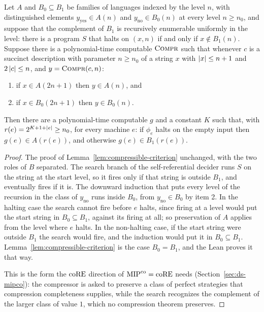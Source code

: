\begin{lemma}
\label{lem:compressible-criterion-nested}
\leanok
Let $A$ and $B_0 \subseteq B_1$ be families of languages indexed by the level $n$, with
distinguished elements $y_{\mathrm{yes}} \in A(n)$ and $y_{\mathrm{no}} \in B_0(n)$ at every
level $n \geq n_0$, and suppose that the complement of $B_1$ is recursively enumerable
uniformly in the level: there is a program $S$ that halts on $(x, n)$ if and only if
$x \notin B_1(n)$. Suppose there is a polynomial-time computable $\textsc{Compr}$ such that whenever
$c$ is a succinct description with parameter $n \geq n_0$ of a string $x$ with
$\left\vert {x} \right\vert \leq n + 1$ and $2\left\vert {c} \right\vert \leq n$, and $y = \textsc{Compr}(c, n)$:
\begin{enumerate}
\item if $x \in A(2n+1)$ then $y \in A(n)$, and
\item if $x \in B_0(2n+1)$ then $y \in B_0(n)$.
\end{enumerate}
Then there are a polynomial-time computable $g$ and a constant $K$ such that, with
$r(e) = 2^{K + 1 + \left\vert {e} \right\vert} \geq n_0$, for every machine $e$: if $\phi_e$ halts on the
empty input then $g(e) \in A(r(e))$, and otherwise $g(e) \in B_1(r(e))$.
\end{lemma}

\begin{proof}
\leanok
The proof of Lemma~\ref{lem:compressible-criterion} unchanged, with the two roles of $B$
separated. The search branch of the self-referential decider runs $S$ on the string at the
start level, so it fires only if that string is outside $B_1$, and eventually fires if it
is. The downward induction that puts every level of the recursion in the class of
$y_{\mathrm{no}}$ runs inside $B_0$, from $y_{\mathrm{no}} \in B_0$ by item 2. In the halting
case the search cannot fire before $e$ halts, since firing at a level would put the start
string in $B_0 \subseteq B_1$, against its firing at all; so preservation of $A$ applies from
the level where $e$ halts. In the non-halting case, if the start string were outside $B_1$
the search would fire, and the induction would put it in $B_0 \subseteq B_1$.
Lemma~\ref{lem:compressible-criterion} is the case $B_0 = B_1$, and the Lean proves it that
way.

This is the form the $\mathrm{coRE}$ direction of $\mathrm{MIP}^{\mathrm{co}} = \mathrm{coRE}$ needs
(Section~\ref{sec:ds-mipco}): the compressor is asked to preserve a class of perfect
strategies that compression completeness supplies, while the search recognizes the
complement of the larger class of value $1$, which no compression theorem preserves.
\end{proof}

